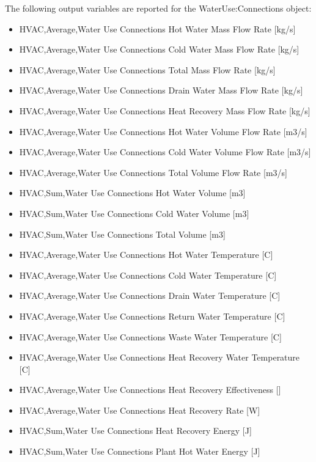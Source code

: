 The following output variables are reported for the WaterUse:Connections object:

\begin{itemize}
\item
  HVAC,Average,Water Use Connections Hot Water Mass Flow Rate {[}kg/s{]}
\item
  HVAC,Average,Water Use Connections Cold Water Mass Flow Rate {[}kg/s{]}
\item
  HVAC,Average,Water Use Connections Total Mass Flow Rate {[}kg/s{]}
\item
  HVAC,Average,Water Use Connections Drain Water Mass Flow Rate {[}kg/s{]}
\item
  HVAC,Average,Water Use Connections Heat Recovery Mass Flow Rate {[}kg/s{]}
\item
  HVAC,Average,Water Use Connections Hot Water Volume Flow Rate {[}m3/s{]}
\item
  HVAC,Average,Water Use Connections Cold Water Volume Flow Rate {[}m3/s{]}
\item
  HVAC,Average,Water Use Connections Total Volume Flow Rate {[}m3/s{]}
\item
  HVAC,Sum,Water Use Connections Hot Water Volume {[}m3{]}
\item
  HVAC,Sum,Water Use Connections Cold Water Volume {[}m3{]}
\item
  HVAC,Sum,Water Use Connections Total Volume {[}m3{]}
\item
  HVAC,Average,Water Use Connections Hot Water Temperature {[}C{]}
\item
  HVAC,Average,Water Use Connections Cold Water Temperature {[}C{]}
\item
  HVAC,Average,Water Use Connections Drain Water Temperature {[}C{]}
\item
  HVAC,Average,Water Use Connections Return Water Temperature {[}C{]}
\item
  HVAC,Average,Water Use Connections Waste Water Temperature {[}C{]}
\item
  HVAC,Average,Water Use Connections Heat Recovery Water Temperature {[}C{]}
\item
  HVAC,Average,Water Use Connections Heat Recovery Effectiveness {[]}
\item
  HVAC,Average,Water Use Connections Heat Recovery Rate {[}W{]}
\item
  HVAC,Sum,Water Use Connections Heat Recovery Energy {[}J{]}
\item
  HVAC,Sum,Water Use Connections Plant Hot Water Energy {[}J{]}
\end{itemize}

